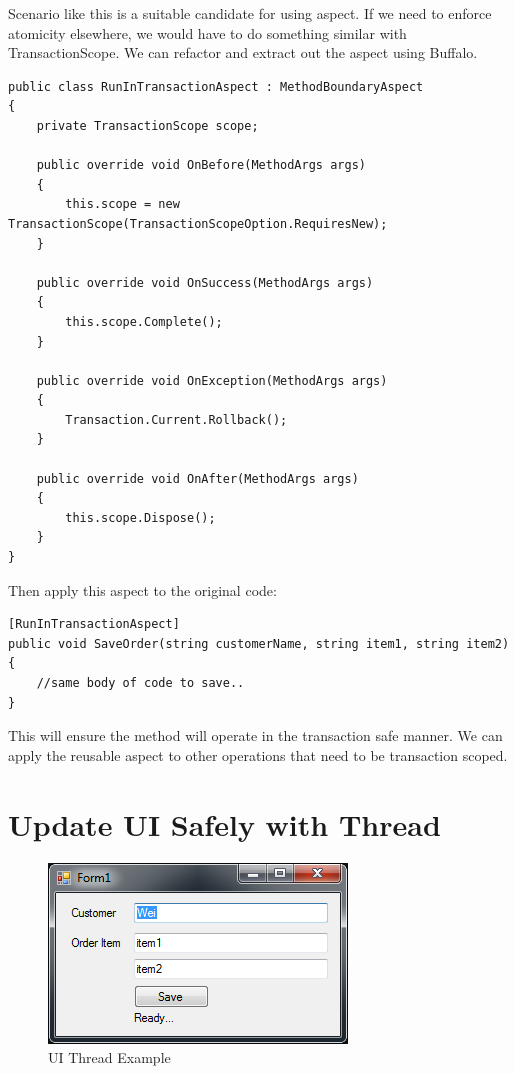 Scenario like this is a suitable candidate for using aspect. If we need to enforce atomicity elsewhere, we would have to do something similar with TransactionScope. We can refactor and extract out the aspect using Buffalo.

\begin{lstlisting}[caption={RunInTransactionAspect}, label=transaspect, frame=tb, basicstyle=\scriptsize]
public class RunInTransactionAspect : MethodBoundaryAspect
{
	private TransactionScope scope;

	public override void OnBefore(MethodArgs args)
	{
		this.scope = new TransactionScope(TransactionScopeOption.RequiresNew);
	}

	public override void OnSuccess(MethodArgs args)
	{
		this.scope.Complete();
	}

	public override void OnException(MethodArgs args)
	{
		Transaction.Current.Rollback();
	}

	public override void OnAfter(MethodArgs args)
	{
		this.scope.Dispose();
	}
}
\end{lstlisting}

Then apply this aspect to the original code:
\begin{lstlisting}[caption={SaveOrder with Aspect}, label=saveorderwithaspect, frame=tb, basicstyle=\scriptsize]
[RunInTransactionAspect]
public void SaveOrder(string customerName, string item1, string item2)
{
	//same body of code to save..
}
\end{lstlisting}

This will ensure the method will operate in the transaction safe manner. We can apply the reusable aspect to other operations that need to be transaction scoped.

\section{Update UI Safely with Thread}

\begin{figure}[H]
  \includegraphics[scale=1.0]{Thread.PNG}
  \centering
  \caption{UI Thread Example\label{uithread}}
\end{figure}

